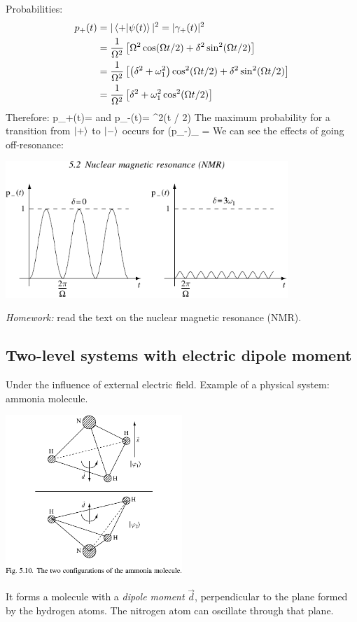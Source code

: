 \documentclass[12pt]{article}
\begin{document}
Probabilities:
\[
\begin{aligned}
p_+(t) 
&= |\bra{+}\ket{\psi(t)}|^2 = |\gamma_+(t)|^2\\
&=\frac{1}{\Omega^{2}}\left[\Omega^{2} \cos (\Omega t / 2)+\delta^{2} \sin ^{2}(\Omega t / 2)\right]\\
&=\frac{1}{\Omega^{2}}\left[\left(\delta^{2}+\omega_{1}^{2}\right) \cos ^{2}(\Omega t / 2)+\delta^{2} \sin ^{2}(\Omega t / 2)\right]\\
&=\frac{1}{\Omega^{2}}\left[\delta^{2}+\omega_{1}^{2} \cos ^{2}(\Omega t / 2)\right]
\end{aligned}
\]
Therefore:
\be
p_{+}(t)=
\ee
and
\be
p_{-}(t)= \sin ^{2}(\Omega t / 2)
\ee
The maximum probability for a transition
from $\ket{+}$ to $\ket{-}$ occurs for
\be
\left(p_{-}\right)_{\max} \Rightarrow 
{} = 
\ee
We can see the effects of going off-resonance:
\begin{center}
\includegraphics[width=0.8\textwidth]{Figures/RabiOscillations.pdf}
\end{center}

\emph{Homework:} read the text on the nuclear magnetic resonance (NMR).

\clearpage


\subsection{Two-level systems with electric dipole moment}

Under the influence of external electric field.
Example of a physical system: ammonia molecule.
\begin{center}
\includegraphics[width=0.5\textwidth]{Figures/ammoniaMolecule.pdf}
\end{center}
It forms a molecule with a \emph{dipole moment} $\vec{d}$,
perpendicular to the plane formed by the hydrogen atoms. The nitrogen atom can oscillate through that plane.
\end{document}
